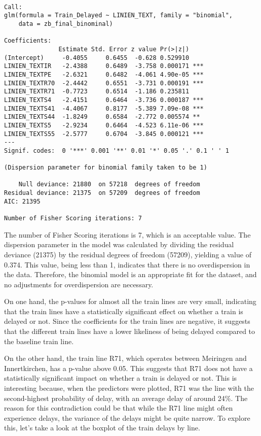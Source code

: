 \documentclass[
]{article}
\begin{document}
\begin{verbatim}

Call:
glm(formula = Train_Delayed ~ LINIEN_TEXT, family = "binomial", 
    data = zb_final_binominal)

Coefficients:
               Estimate Std. Error z value Pr(>|z|)    
(Intercept)     -0.4055     0.6455  -0.628 0.529910    
LINIEN_TEXTIR   -2.4388     0.6489  -3.758 0.000171 ***
LINIEN_TEXTPE   -2.6321     0.6482  -4.061 4.90e-05 ***
LINIEN_TEXTR70  -2.4442     0.6551  -3.731 0.000191 ***
LINIEN_TEXTR71  -0.7723     0.6514  -1.186 0.235811    
LINIEN_TEXTS4   -2.4151     0.6464  -3.736 0.000187 ***
LINIEN_TEXTS41  -4.4067     0.8177  -5.389 7.09e-08 ***
LINIEN_TEXTS44  -1.8249     0.6584  -2.772 0.005574 ** 
LINIEN_TEXTS5   -2.9234     0.6464  -4.523 6.11e-06 ***
LINIEN_TEXTS55  -2.5777     0.6704  -3.845 0.000121 ***
---
Signif. codes:  0 '***' 0.001 '**' 0.01 '*' 0.05 '.' 0.1 ' ' 1

(Dispersion parameter for binomial family taken to be 1)

    Null deviance: 21880  on 57218  degrees of freedom
Residual deviance: 21375  on 57209  degrees of freedom
AIC: 21395

Number of Fisher Scoring iterations: 7
\end{verbatim}

The number of Fisher Scoring iterations is 7, which is an acceptable
value. The dispersion parameter in the model was calculated by dividing
the residual deviance (21375) by the residual degrees of freedom
(57209), yielding a value of 0.374. This value, being less than 1,
indicates that there is no overdispersion in the data. Therefore, the
binomial model is an appropriate fit for the dataset, and no adjustments
for overdispersion are necessary.

On one hand, the p-values for almost all the train lines are very small,
indicating that the train lines have a statistically significant effect
on whether a train is delayed or not. Since the coefficients for the
train lines are negative, it suggests that the different train lines
have a lower likeliness of being delayed compared to the baseline train
line.

On the other hand, the train line R71, which operates between Meiringen
and Innertkirchen, has a p-value above 0.05. This suggests that R71 does
not have a statistically significant impact on whether a train is
delayed or not. This is interesting because, when the predictors were
plotted, R71 was the line with the second-highest probability of delay,
with an average delay of around 24\%. The reason for this contradiction
could be that while the R71 line might often experience delays, the
variance of the delays might be quite narrow. To explore this, let's
take a look at the boxplot of the train delays by line.
\end{document}
